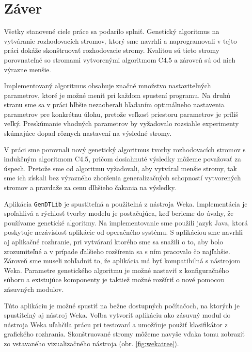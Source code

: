 \chapter{Záver}\label{kap:fin}
\renewcommand{\figurename}{Obrázok}
Všetky stanovené ciele práce sa podarilo splniť. Genetický algoritmus na vytváranie rozhodovacích stromov, ktorý sme navrhli a naprogramovali v tejto práci dokáže skonštruovať rozhodovacie stromy. Kvalitou sú tieto stromy porovnateľné so stromami vytvorenými algoritmom C4.5 a zároveň sú od nich výrazne menšie.

Implementovaný algoritmus obsahuje značné množstvo nastaviteľných parametrov, ktoré je možné meniť pri každom spustení programu. Na druhú stranu sme sa v práci hlbšie nezaoberali hľadaním optimálneho nastavenia parametrov pre konkrétnu úlohu, pretože veľkosť priestoru parametrov je príliš veľký. Preskúmanie vhodných parametrov by vyžadovalo rozsiahle experimenty skúmajúce dopad rôznych nastavení na výsledné stromy.

V práci sme porovnali nový genetický algoritmus tvorby rozhodovacích stromov s indukčným algoritmom C4.5, pričom dosiahnuté výsledky môžeme považovať za úspech.
Pretože sme od algoritmu vyžadovali, aby vytváral menšie stromy, tak sme ich získali bez výrazného zhoršenia generalizačných schopností vytvorených stromov a pravdaže za cenu dlhšieho čakania na výsledky.

Aplikácia \verb|GenDTLib| je spustiteľná a použiteľná z nástroja Weka. Implementácia je spoľahlivá a rýchlosť tvorby modelu je postačujúca, keď berieme do úvahy, že používame genetické algoritmy. Na implementovanie sme použili jazyk Java, ktorá poskytuje nezávislosť aplikácie od operačného systému. S aplikáciou sme navrhli aj aplikačné rozhranie, pri vytváraní ktorého sme sa snažili o to, aby bolo zrozumiteľné a v prípade ďalšieho rozšírenia sa s ním pracovalo čo najľahšie. Zároveň sme museli zohľadniť to, že aplikácia má byť kompatibilná s nástrojom Weka. Parametre genetického algoritmu je možné nastaviť z konfiguračného súboru a existujúce komponenty je taktiež možné rozšíriť o nové pomocou zásuvných modulov.

Túto aplikáciu je možné spustiť na bežne dostupných počítačoch, na ktorých je spustiteľný aj nástroj Weka. 
Voľba vytvoriť aplikáciu ako zásuvný modul do nástroja Weka uľahčila prácu pri testovaní a umožňuje použiť klasifikátor z grafického rozhrania. Skonštruované stromy môžeme navyše vďaka tomu zobraziť zo vstavaného vizualizačného nástroja (obr. \ref{fig:wekatree}).

